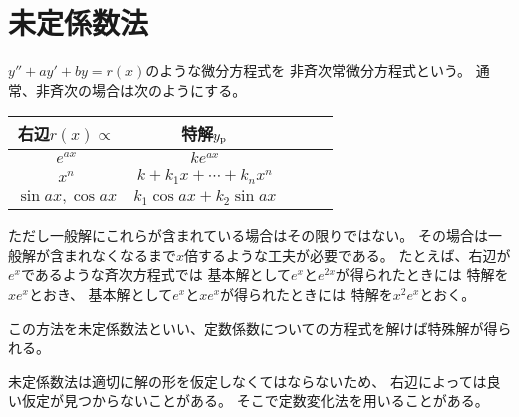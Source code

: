 \newpage
\section{未定係数法}
$y''+ay'+by=r(x)$のような微分方程式を
非斉次常微分方程式という。
通常、非斉次の場合は次のようにする。

\begin{table}[H]
\centering
\begin{tabular}{ccccc}
\toprule
  右辺$r(x)\propto$ & 特解$y_{\rm{p}}$ \\
\midrule
  $e^{ax}$ & $k e^{ax}$ \\
  $x^n$ & $k + k_1 x + \cdots + k_n x^n$ \\
  $\sin{ax},\cos{ax}$ & $k_1 \cos{ax} + k_2 \sin{ax}$ \\
\bottomrule
\end{tabular}\end{table}

ただし一般解にこれらが含まれている場合はその限りではない。
その場合は一般解が含まれなくなるまで$x$倍するような工夫が必要である。
たとえば、右辺が$e^x$であるような斉次方程式では
基本解として$e^x$と$e^{2x}$が得られたときには
特解を$xe^x$とおき、
基本解として$e^x$と$xe^{x}$が得られたときには
特解を$x^2e^x$とおく。

この方法を未定係数法といい、定数係数についての方程式を解けば特殊解が得られる。

未定係数法は適切に解の形を仮定しなくてはならないため、
右辺によっては良い仮定が見つからないことがある。
そこで定数変化法を用いることがある。
